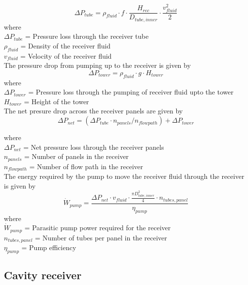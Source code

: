\begin{equation}
\Delta P_{tube}=\rho_{fluid} \cdot f\cdot \frac{H_{rec}}{D_{tube,inner}} \cdot \frac{v_{fluid}^2}{2}
\end{equation}
where\\
$\Delta P_{tube}$ = Pressure loss through the receiver tube\\
$\rho_{fluid}$ = Density of the receiver fluid \\
$v_{fluid}$ = Velocity of the receiver fluid \\

The pressure drop from pumping up to the receiver is given by\\
\begin{equation}
\Delta P_{tower}=\rho_{fluid}\cdot g \cdot H_{tower}
\end{equation}
where\\
$\Delta P_{tower}$ = Pressure loss through the pumping of receiver fluid upto the tower\\
$H_{tower}$ = Height of the tower \\

The net presure drop across the receiver panels are given by 
\begin{equation}
\Delta P_{net}=(\Delta P_{tube}\cdot  n_{panels}/n_{flow path})+\Delta P_{tower}
\end{equation}

where\\
$\Delta P_{net}$ = Net pressure loss through the receiver panels\\
$n_{panels}$ = Number of panels in the receiver \\
$n_{flow path}$ = Number of flow path in the receiver \\

The energy required by the pump to move the receiver fluid through the receiver is given by
\begin{equation}
\dot W_{pump}= \frac {\Delta P_{net}\cdot v_{fluid}\cdot \frac {\pi D_{tube,inner}^2}{4}\cdot n_{tubes,panel}}{\eta_{pump}}
\end{equation} 
where\\
$\dot W_{pump}$ = Parasitic pump power required for the receiver \\
$n_{tubes,panel}$ = Number of tubes per panel in the receiver \\
$\eta_{pump}$ = Pump efficiency \\
\subsection{Cavity receiver}
